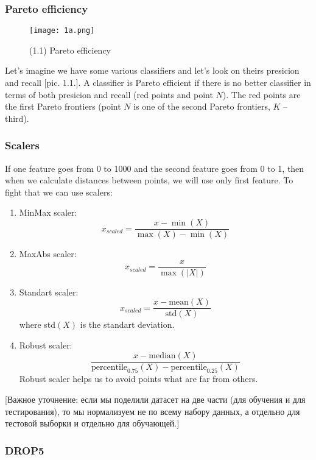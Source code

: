 \newpage
\subsubsection*{Pareto efficiency}

\begin{wrapfigure}{r}{0.25\linewidth}
	\vspace{-1.25cm}
  \begin{center}
    \texttt{[image: 1a.png]}
  \end{center}
  \vspace{-0.8cm}
  \caption*{(1.1) Pareto efficiency}
  \vspace{-1cm}
\end{wrapfigure}
Let's imagine we have some various classifiers and let's look on theirs presicion and recall [pic. 1.1.]. A classifier is Pareto efficient if there is no better classifier in terms of both presicion and recall (red points and point $N$). The red points are the first Pareto frontiers (point $N$ is one of the second Pareto frontiers, $K$ -- third).

\subsubsection*{Scalers}

If one feature goes from 0 to 1000 and the second feature goes from 0 to 1, then when we calculate distances between points, we will use only first feature. To fight that we can use scalers:
\begin{enumerate}[label=$\bullet$]
	\item MinMax scaler: $$x_{scaled}=\frac{x-\min(X)}{\max(X)-\min(X)}$$
	\item MaxAbs scaler: $$x_{scaled}=\frac{x}{\max(|X|)}$$
	\item Standart scaler: $$x_{scaled}=\frac{x-\text{mean}(X)}{\text{std}(X)}$$ where std$(X)$ is the standart deviation.
	\item Robust scaler: $$\frac{x-\text{median}(X)}{\text{percentile}_{0.75}(X)-\text{percentile}_{0.25}(X)}$$
	Robust scaler helps us to avoid points what are far from others.
\end{enumerate}
[Важное уточнение: если мы поделили датасет на две части (для обучения и для тестирования), то мы нормализуем не по всему набору данных, а отдельно для тестовой выборки и отдельно для обучающей.]

\subsubsection*{DROP5}


